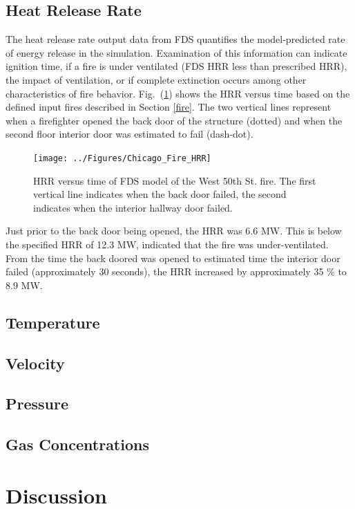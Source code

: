 \documentclass[11pt,oneside]{book}
\begin{document}
\section{Heat Release Rate}
\label{HRR}
The heat release rate output data from FDS quantifies the model-predicted rate of energy release in the simulation. Examination of this information can indicate ignition time, if a fire is under ventilated (FDS HRR less than prescribed HRR), the impact of ventilation, or if complete extinction occurs among other characteristics of fire behavior. Fig.~(\ref{fig:hrr}) shows the HRR versus time based on the defined input fires described in Section \ref{fire}. The two vertical lines represent when a firefighter opened the back door of the structure (dotted) and when the second floor interior door was estimated to fail (dash-dot).

\begin{figure}[h!]
\centering
\texttt{[image: ../Figures/Chicago\_Fire\_HRR]}
\caption{HRR versus time of FDS model of the West 50th St. fire. The first vertical line indicates when the back door failed, the second indicates when the interior hallway door failed.}
\label{fig:hrr}
\end{figure}

Just prior to the back door being opened, the HRR was 6.6 MW. This is below the specified HRR of 12.3 MW, indicated that the fire was under-ventilated. From the time the back doored was opened to estimated time the interior door failed (approximately 30 seconds), the HRR increased by approximately 35 \% to 8.9 MW.



\section{Temperature}

\section{Velocity}

\section{Pressure}

\section{Gas Concentrations}

\chapter{Discussion}
\end{document}
